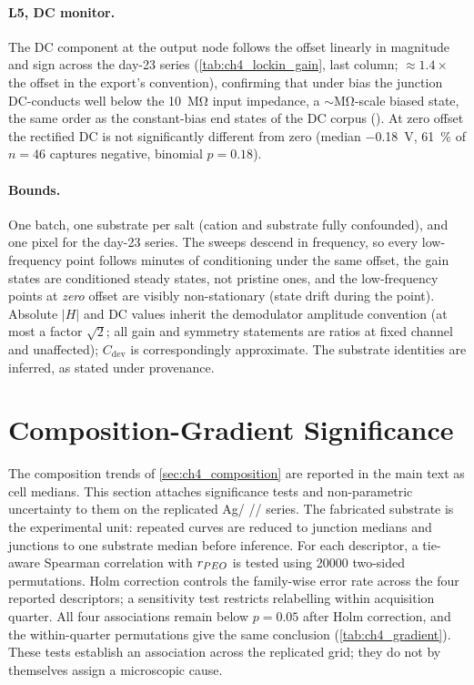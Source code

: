 \paragraph{L5, DC monitor.} The DC component at the output node follows
the offset linearly in magnitude and sign across the day-23 series
(\cref{tab:ch4_lockin_gain}, last column; \(\approx\!1.4\times\) the offset
in the export's convention), confirming that under bias the junction
DC-conducts well below the \SI{10}{\mega\ohm} input impedance, a
\(\sim\!\si{\mega\ohm}\)-scale biased state, the same order as the
constant-bias end states of the DC corpus
(). At zero offset the rectified DC is not
significantly different from zero (median \SI{-0.18}{\volt}, \SI{61}{\percent}
of \(n=46\) captures negative, binomial \(p=0.18\)).

\paragraph{Bounds.} One batch, one substrate per salt (cation and substrate
fully confounded), and one pixel for the day-23 series. The sweeps descend in
frequency, so every low-frequency point follows minutes of conditioning under
the same offset, the gain states are conditioned steady states, not
pristine ones, and the low-frequency points at \emph{zero} offset are visibly
non-stationary (state drift during the point). Absolute \(|H|\) and DC
values inherit the demodulator amplitude convention (at most a factor
\(\sqrt{2}\); all gain and symmetry statements are ratios at fixed channel
and unaffected); \(C_\mathrm{dev}\) is correspondingly approximate. The
substrate identities are inferred, as stated under provenance.

\section{Composition-Gradient Significance}\label{app:ch4_gradient}

The composition trends of \cref{sec:ch4_composition} are reported in the main text
as cell medians. This section attaches significance tests and non-parametric
uncertainty to them on the replicated Ag/ \SY{}/\PEO{}/\LiTf{} series.
The fabricated substrate is the experimental unit: repeated curves are reduced
to junction medians and junctions to one substrate median before inference. For
each descriptor, a tie-aware Spearman correlation with \(r_{PEO{}}\) is tested
using \num{20000} two-sided permutations. Holm correction controls the
family-wise error rate across the four reported descriptors; a sensitivity test
restricts relabelling within acquisition quarter. All four associations remain
below \(p=0.05\) after Holm correction, and the within-quarter permutations give
the same conclusion (\cref{tab:ch4_gradient}). These tests establish an
association across the replicated grid; they do not by themselves assign a
microscopic cause.

